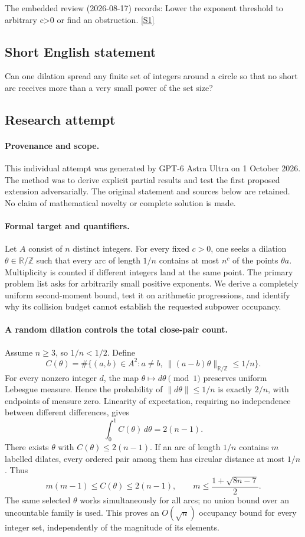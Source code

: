 \documentclass[11pt,a4paper]{article}
\newcommand{\Z}{\mathbb{Z}}
\newcommand{\R}{\mathbb{R}}
\newcommand{\sref}[2]{\hyperlink{source:#1:#2}{[S#2]}}
\begin{document}
The embedded review (2026-08-17) records: Lower the exponent threshold to arbitrary c>0 or find an obstruction. \sref{statement}{1}

\subsection{Short English statement}

Can one dilation spread any finite set of integers around a circle so that no short arc receives more than a very small power of the set size?

\subsection{Research attempt}

\paragraph{Provenance and scope.}
This individual attempt was generated by GPT-6 Astra Ultra on 1 October 2026. The method was to derive explicit partial results and test the first proposed extension adversarially. The original statement and sources below are retained. No claim of mathematical novelty or complete solution is made.

\paragraph{Formal target and quantifiers.}
Let $A$ consist of $n$ distinct integers. For every fixed $c>0$, one seeks a dilation $\theta\in\R/\Z$ such that every arc of length $1/n$ contains at most $n^c$ of the points $\theta a$. Multiplicity is counted if different integers land at the same point. The primary problem list asks for arbitrarily small positive exponents. We derive a completely uniform second-moment bound, test it on arithmetic progressions, and identify why its collision budget cannot establish the requested subpower occupancy.

\paragraph{A random dilation controls the total close-pair count.}
Assume $n\geq3$, so $1/n<1/2$. Define
\[
 C(\theta)=\#\{(a,b)\in A^2:a\ne b,\ \|(a-b)\theta\|_{\R/\Z}\leq1/n\}.
\]
For every nonzero integer $d$, the map $\theta\mapsto d\theta\pmod1$ preserves uniform Lebesgue measure. Hence the probability of $\|d\theta\|\leq1/n$ is exactly $2/n$, with endpoints of measure zero. Linearity of expectation, requiring no independence between different differences, gives
\[
 \int_0^1C(\theta)\,d\theta=2(n-1).
\]
There exists $\theta$ with $C(\theta)\leq2(n-1)$. If an arc of length $1/n$ contains $m$ labelled dilates, every ordered pair among them has circular distance at most $1/n$. Thus
\[
 m(m-1)\leq C(\theta)\leq2(n-1),\qquad
 m\leq\frac{1+\sqrt{8n-7}}2.
\]
The same selected $\theta$ works simultaneously for all arcs; no union bound over an uncountable family is used. This proves an $O(\sqrt n)$ occupancy bound for every integer set, independently of the magnitude of its elements.
\end{document}

